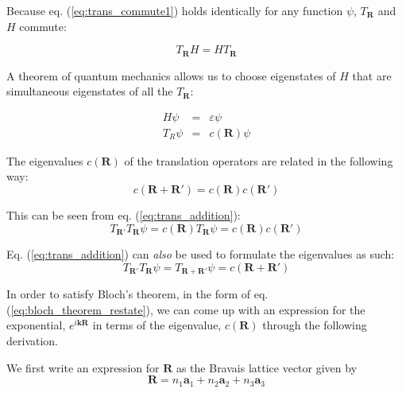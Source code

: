 	Because eq. (\ref{eq:trans_commute1}) holds identically for any function $\psi$, $T_{\mathbf{R}}$ and $H$ commute:

	\begin{equation} \label{eq:trans_commute_relation}
		T_{\mathbf{R}} H = H T_{\mathbf{R}}
	\end{equation}

	A theorem of quantum mechanics  allows us to choose eigenstates of $H$ that are simultaneous eigenstates of all the $T_{\mathbf{R}}$:

	\begin{eqnarray} 
		H\psi &=& \varepsilon\psi \nonumber \\
		T_{R} \psi &=& c(\mathbf{R}) \psi \label{eq:eigenstates}
	\end{eqnarray}

	The eigenvalues $c(\mathbf{R})$ of the translation operators are related in the following way:
	\begin{equation} \label{eq:c_relation}
		c(\mathbf{R} + \mathbf{R'}) 
		= c(\mathbf{R}) c(\mathbf{R}')
	\end{equation}

	This can be seen from eq. (\ref{eq:trans_addition}):
	\begin{equation} \label{eq:derive_crelation1}
		T_{\mathbf{R}'} T_{\mathbf{R}} \psi
		= c(\mathbf{R}) T_{\mathbf{R}} \psi
		= c(\mathbf{R}) c(\mathbf{R}')
	\end{equation}

	Eq. (\ref{eq:trans_addition}) can \emph{also} be used to formulate the eigenvalues as such:
	\begin{equation}
		T_{\mathbf{R}'} T_{\mathbf{R}} \psi
		= T_{\mathbf{R} + \mathbf{R'}} \psi
		= c(\mathbf{R} + \mathbf{R'}) 
	\end{equation}

	In order to satisfy Bloch's theorem, in the form of eq. (\ref{eq:bloch_theorem_restate}), we can come up with an expression for the exponential, $e^{i\mathbf{k} \mathbf{R}}$ in terms of the eigenvalue, $c(\mathbf{R})$ through the following derivation.

	We first write an expression for $\mathbf{R}$ as the Bravais lattice vector given by
	\begin{equation} \label{eq:r_express}
		\mathbf{R} = n_{1} \mathbf{a}_{1}
		+ n_{2} \mathbf{a}_{2}
		+ n_{3} \mathbf{a}_{3}
	\end{equation}

